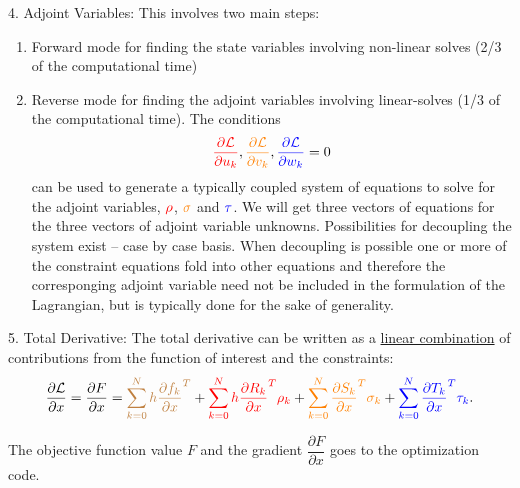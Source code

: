 \documentclass{beamer}
\newcommand{\pd}[2]{\dfrac{\partial #1}{\partial #2}}
\newenvironment{noheadline}{
    \setbeamertemplate{headline}{}
    \addtobeamertemplate{frametitle}{\vspace*{-1.5\baselineskip}}{}
}{}
\begin{document}
\begin{noheadline}
\begin{frame}[allowframebreaks]
{\begin{block}{4. Adjoint Variables:}
  This involves two main steps:
  \begin{enumerate}
  \item Forward mode for finding the state variables involving non-linear solves (2/3 of the
    computational time)
  \item Reverse mode for finding the adjoint variables involving
    linear-solves (1/3 of the computational time). The
    conditions $$\textcolor{red}{\pd{\cal{L}}{u_k}},
    \textcolor{orange}{\pd{\cal{L}}{v_k}},
    \textcolor{blue}{\pd{\cal{L}}{w_k}} = 0$$ can be used to generate
    a typically coupled system of equations to solve for the adjoint
    variables, $\textcolor{red}{\rho}$, $\textcolor{orange}{\sigma}$
    and $\textcolor{blue}{\tau}$. We will get three vectors of
    equations for the three vectors of adjoint variable
    unknowns. Possibilities for decoupling the system exist -- case by
    case basis. When decoupling is possible one or more of the
    constraint equations fold into other equations and therefore the
    corresponging adjoint variable need not be included in the
    formulation of the Lagrangian, but is typically done for the sake
    of generality.
  \end{enumerate}
\end{block}

  \begin{block}{5. Total Derivative:}
    The total derivative can be
    written as a \underline{linear combination} of contributions from the function
    of interest and the constraints:
    \begin{equation}\label{eqn:nbg-total-derivative}
      \pd{\cal{L}}{x} = \pd{F}{x} = 
      \textcolor{brown}{\sum_{k=0}^N h \pd{f_k}{x}^T} + 
      \textcolor{red}{\sum_{k=0}^N h \pd{R_k}{x}^T \rho_k} + 
      \textcolor{orange}{\sum_{k=0}^N \pd{S_k}{x}^T \sigma_k} + 
      \textcolor{blue}{\sum_{k=0}^N \pd{T_k}{x}^T \tau_k}.
    \end{equation}
  \end{block}
  The objective function value $F$ and the gradient $\pd{F}{x}$ goes
  to the optimization code.

  \framebreak

}
\end{frame}
\end{noheadline}
\end{document}
